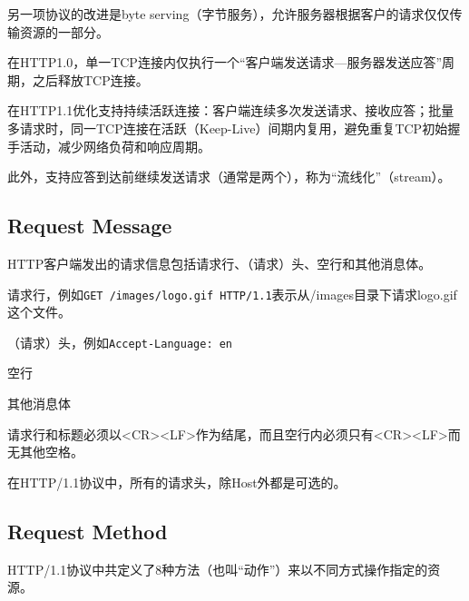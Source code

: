 另一项协议的改进是byte serving（字节服务），允许服务器根据客户的请求仅仅传输资源的一部分。

\begin{compactitem}
\item 在HTTP1.0，单一TCP连接内仅执行一个“客户端发送请求—服务器发送应答”周期，之后释放TCP连接。
\item 在HTTP1.1优化支持持续活跃连接：客户端连续多次发送请求、接收应答；批量多请求时，同一TCP连接在活跃（Keep-Live）间期内复用，避免重复TCP初始握手活动，减少网络负荷和响应周期。
\end{compactitem}

此外，支持应答到达前继续发送请求（通常是两个），称为“流线化”（stream）。



\subsection{Request Message}

HTTP客户端发出的请求信息包括请求行、（请求）头、空行和其他消息体。

\begin{compactitem}
\item 请求行，例如\texttt{GET /images/logo.gif HTTP/1.1}表示从/images目录下请求logo.gif这个文件。
\item （请求）头，例如\texttt{Accept-Language: en}
\item 空行
\item 其他消息体
\end{compactitem}

请求行和标题必须以<CR><LF>作为结尾，而且空行内必须只有<CR><LF>而无其他空格。

在HTTP/1.1协议中，所有的请求头，除Host外都是可选的。




\subsection{Request Method}


HTTP/1.1协议中共定义了8种方法（也叫“动作”）来以不同方式操作指定的资源。

